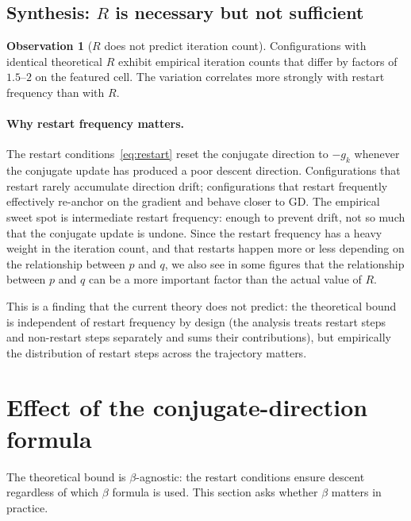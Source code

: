 \documentclass[11pt,a4paper]{article}
\theoremstyle{plain}
\theoremstyle{definition}
\newtheorem{observation}{Observation}[section]
\begin{document}
\subsection{Synthesis: $R$ is necessary but not sufficient}\label{subsec:pq-synth}

\begin{observation}[$R$ does not predict iteration count]\label{obs:R-not-predictive}
Configurations with identical theoretical $R$ exhibit empirical iteration 
counts that differ by factors of $1.5$--$2$ on the featured cell. 
The variation correlates more strongly with restart frequency than with $R$.
\end{observation}

\paragraph{Why restart frequency matters.}
The restart conditions~\eqref{eq:restart} reset the conjugate direction 
to $-g_k$ whenever the conjugate update has produced a poor descent direction. 
Configurations that restart rarely accumulate direction drift; configurations 
that restart frequently effectively re-anchor on the gradient and behave 
closer to GD. The empirical sweet spot is intermediate restart frequency: 
enough to prevent drift, not so much that the conjugate update is undone.
Since the restart frequency has a heavy weight in the iteration count, and that
restarts happen more or less depending on the relationship between $p$ and $q$,
we also see in some figures that the relationship between $p$ and $q$ can be a
more important factor than the actual value of $R$.

This is a finding that the current theory does not predict: the theoretical 
bound is independent of restart frequency by design (the analysis treats 
restart steps and non-restart steps separately and sums their contributions), 
but empirically the distribution of restart steps across the trajectory
matters.

\section{Effect of the conjugate-direction formula}\label{sec:beta}

The theoretical bound is $\beta$-agnostic: the restart conditions ensure
descent regardless of which $\beta$ formula is used. This section asks 
whether $\beta$ matters in practice.
\end{document}
